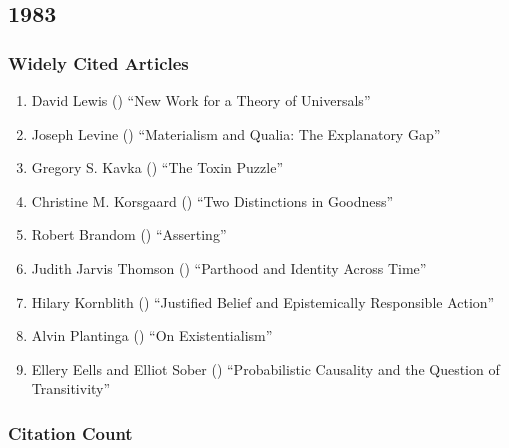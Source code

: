 \documentclass[
  10pt,
  letterpaper,
  DIV=11,
  numbers=noendperiod,
  twoside]{scrartcl}
\providecommand{\tightlist}{%
  \setlength{\itemsep}{0pt}\setlength{\parskip}{0pt}}\usepackage{longtable,booktabs,array}
\begin{document}
\newpage

\subsection{1983}\label{sec-s1983}

\subsubsection*{Widely Cited Articles}\label{widely-cited-articles-26}

\begin{enumerate}
\def\labelenumi{\arabic{enumi}.}
\tightlist
\item
  David Lewis () ``New Work for a
  Theory of Universals''
\item
  Joseph Levine () ``Materialism
  and Qualia: The Explanatory Gap''
\item
  Gregory S. Kavka () ``The Toxin
  Puzzle''
\item
  Christine M. Korsgaard () ``Two
  Distinctions in Goodness''
\item
  Robert Brandom () ``Asserting''
\item
  Judith Jarvis Thomson ()
  ``Parthood and Identity Across Time''
\item
  Hilary Kornblith () ``Justified
  Belief and Epistemically Responsible Action''
\item
  Alvin Plantinga () ``On
  Existentialism''
\item
  Ellery Eells and Elliot Sober
  () ``Probabilistic Causality
  and the Question of Transitivity''
\end{enumerate}

\subsubsection*{Citation Count}\label{sec-count-1983}
\end{document}

